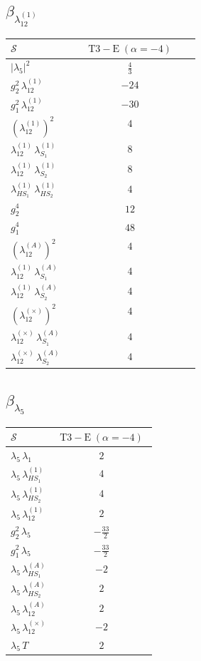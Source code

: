 \documentclass[9pt]{article}
\begin{document}
\subsection*{$ \beta_{\lambda_{12}^{(1)}} $}
\begin{longtable}{@{}p{0.31\linewidth}c@{}}
\toprule
$\mathcal{S}$ & $ \mathrm{T3-E}\;(\alpha=-4) $ \\
\midrule
$ |\lambda_5|^2 $ & $ \frac{4}{3} $ \\
$ g_2^2\,\lambda_{12}^{(1)} $ & $ -24 $ \\
$ g_1^2\,\lambda_{12}^{(1)} $ & $ -30 $ \\
$ \left(\lambda_{12}^{(1)}\right)^2 $ & $ 4 $ \\
$ \lambda_{12}^{(1)}\,\lambda_{S_1}^{(1)} $ & $ 8 $ \\
$ \lambda_{12}^{(1)}\,\lambda_{S_2}^{(1)} $ & $ 8 $ \\
$ \lambda_{HS_1}^{(1)}\,\lambda_{HS_2}^{(1)} $ & $ 4 $ \\
$ g_2^4 $ & $ 12 $ \\
$ g_1^4 $ & $ 48 $ \\
$ \left(\lambda_{12}^{(A)}\right)^2 $ & $ 4 $ \\
$ \lambda_{12}^{(1)}\,\lambda_{S_1}^{(A)} $ & $ 4 $ \\
$ \lambda_{12}^{(1)}\,\lambda_{S_2}^{(A)} $ & $ 4 $ \\
$ \left(\lambda_{12}^{(\times)}\right)^2 $ & $ 4 $ \\
$ \lambda_{12}^{(\times)}\,\lambda_{S_1}^{(A)} $ & $ 4 $ \\
$ \lambda_{12}^{(\times)}\,\lambda_{S_2}^{(A)} $ & $ 4 $ \\
\bottomrule
\end{longtable}
\subsection*{$ \beta_{\lambda_5} $}
\begin{longtable}{@{}p{0.31\linewidth}c@{}}
\toprule
$\mathcal{S}$ & $ \mathrm{T3-E}\;(\alpha=-4) $ \\
\midrule
$ \lambda_5\,\lambda_1 $ & $ 2 $ \\
$ \lambda_5\,\lambda_{HS_1}^{(1)} $ & $ 4 $ \\
$ \lambda_5\,\lambda_{HS_2}^{(1)} $ & $ 4 $ \\
$ \lambda_5\,\lambda_{12}^{(1)} $ & $ 2 $ \\
$ g_2^2\,\lambda_5 $ & $ - \frac{33}{2} $ \\
$ g_1^2\,\lambda_5 $ & $ - \frac{33}{2} $ \\
$ \lambda_5\,\lambda_{HS_1}^{(A)} $ & $ -2 $ \\
$ \lambda_5\,\lambda_{HS_2}^{(A)} $ & $ 2 $ \\
$ \lambda_5\,\lambda_{12}^{(A)} $ & $ 2 $ \\
$ \lambda_5\,\lambda_{12}^{(\times)} $ & $ -2 $ \\
$ \lambda_5\,T $ & $ 2 $ \\
\bottomrule
\end{longtable}
\end{document}
